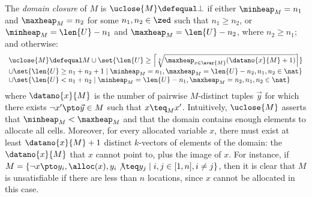 The \emph{domain closure} of $M$ is $\uclose{M} \defequal \bot$ if either
$\minheap_M = n_1$ and $\maxheap_M = n_2$ for some $n_1,n_2 \in \zed$
such that $n_1 \geq n_2$, or $\minheap_M = \len{U} - n_1$ and $\maxheap_M
= \len{U} - n_2$, where $n_2 \geq n_1$; and otherwise:
\[\begin{array}{l}
\uclose{M} \defequal M \cup  \set{\len{U} \geq \left\lceil\sqrt[k]{\maxheap_{x \in \avar{M}}(\datano{x}{M}+1)}\right\rceil}  \\ 
\cup \set{\len{U} \geq n_1+n_2+1 \mid \minheap_M = n_1, \maxheap_M = \len{U}-n_2, n_1, n_2 \in \nat} \\
\cup \set{\len{U} < n_1+n_2 \mid \minheap_M = \len{U}-n_1, \maxheap_M = n_2, n_1, n_2 \in \nat} 
\end{array}\]
where $\datano{x}{M}$ is the number of pairwise $M$-distinct tuples
$\vec{y}$ for which there exists $\neg x' \pto \vec{y} \in M$ such
that $x \teq_M x'$. Intuitively, $\uclose{M}$ asserts that $\minheap_M
< \maxheap_M$ and that the domain contains enough elements to allocate
all cells. Moreover, for every allocated variable $x$,
there must exist at least $\datano{x}{M}+1$ distinct $k$-vectors of
elements of the domain: the $\datano{x}{M}$ that $x$ cannot point to,
plus the image of $x$.  For instance, if $M = \{ \neg x \pto y_i,
\alloc(x), y_i \not \teq y_j \mid i,j \in [1,n], i \not = j \}$, then
it is clear that $M$ is unsatisfiable if there are less than $n$
locations, since $x$ cannot be allocated in this case.

 

